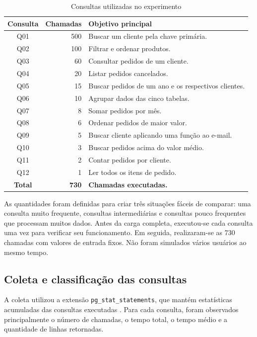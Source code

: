 \begin{table}[H]
\centering
\caption{Consultas utilizadas no experimento}
\label{tab:consultas-simples}
\small
\begin{tabularx}{\textwidth}{c r Y}
\toprule
\textbf{Consulta} & \textbf{Chamadas} & \textbf{Objetivo principal} \\
\midrule
Q01 & 500 & Buscar um cliente pela chave primária. \\
Q02 & 100 & Filtrar e ordenar produtos. \\
Q03 & 60 & Consultar pedidos de um cliente. \\
Q04 & 20 & Listar pedidos cancelados. \\
Q05 & 15 & Buscar pedidos de um ano e os respectivos clientes. \\
Q06 & 10 & Agrupar dados das cinco tabelas. \\
Q07 & 8 & Somar pedidos por mês. \\
Q08 & 6 & Ordenar pedidos de maior valor. \\
Q09 & 5 & Buscar cliente aplicando uma função ao e-mail. \\
Q10 & 3 & Buscar pedidos acima do valor médio. \\
Q11 & 2 & Contar pedidos por cliente. \\
Q12 & 1 & Ler todos os itens de pedido. \\
\midrule
\textbf{Total} & \textbf{730} & \textbf{Chamadas executadas.} \\
\bottomrule
\end{tabularx}
\fonteautor
\end{table}

As quantidades foram definidas para criar três situações fáceis de comparar: uma consulta muito frequente, consultas intermediárias e consultas pouco frequentes que processam muitos dados. Antes da carga completa, executou-se cada consulta uma vez para verificar seu funcionamento. Em seguida, realizaram-se as 730 chamadas com valores de entrada fixos. Não foram simulados vários usuários ao mesmo tempo.

\subsection{Coleta e classificação das consultas}

A coleta utilizou a extensão \texttt{pg\_stat\_statements}, que mantém estatísticas acumuladas das consultas executadas \cite{postgresql2026pgstat}. Para cada consulta, foram observados principalmente o número de chamadas, o tempo total, o tempo médio e a quantidade de linhas retornadas.

